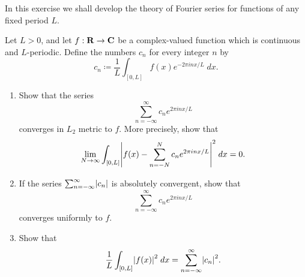 \begin{exercise}\label{ex 5.5.6}
    In this exercise we shall develop the theory of Fourier series for functions of any fixed period \(L\).

    Let \(L > 0\), and let \(f : \mathbf{R} \to \mathbf{C}\) be a complex-valued function which is continuous and \(L\)-periodic.
    Define the numbers \(c_n\) for every integer \(n\) by
    \[
        c_n \coloneqq \frac{1}{L} \int_{[0, L]} f(x) e^{- 2 \pi i n x / L} \; dx.
    \]
    \begin{enumerate}
        \item Show that the series
              \[
                  \sum_{n = -\infty}^\infty c_n e^{2 \pi i n x / L}
              \]
              converges in \(L_2\) metric to \(f\).
              More precisely, show that
              \[
                  \lim_{N \to \infty} \int_{[0, L]} \abs{f(x) - \sum_{n = -N}^N c_n e^{2 \pi i n x / L}}^2 \; dx = 0.
              \]
        \item If the series \(\sum_{n = -\infty}^\infty \abs{c_n}\) is absolutely convergent, show that
              \[
                  \sum_{n = -\infty}^\infty c_n e^{2 \pi i n x / L}
              \]
              converges uniformly to \(f\).
        \item Show that
              \[
                  \frac{1}{L} \int_{[0, L]} \abs{f(x)}^2 \; dx = \sum_{n = -\infty}^\infty \abs{c_n}^2.
              \]
    \end{enumerate}
\end{exercise}